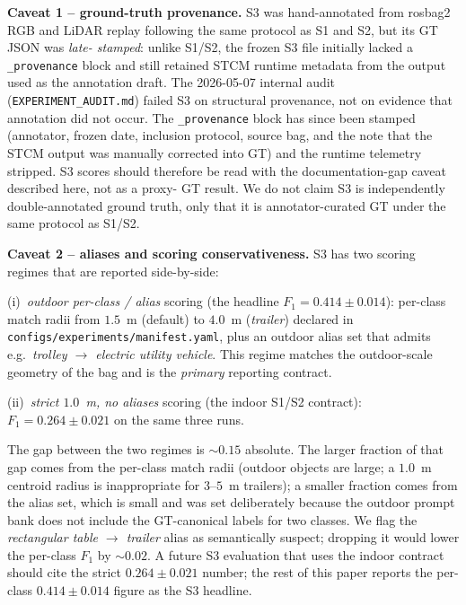 \noindent\textbf{Caveat 1 -- ground-truth provenance.}
S3 was hand-annotated from rosbag2 RGB and LiDAR replay following
the same protocol as S1 and S2, but its GT JSON was \emph{late-
stamped}: unlike S1/S2, the frozen S3 file initially lacked a
\texttt{\_provenance} block and still retained STCM runtime
metadata from the output used as the annotation draft. The
2026-05-07 internal audit (\texttt{EXPERIMENT\_AUDIT.md}) failed S3
on structural provenance, not on evidence that annotation did not
occur. The \texttt{\_provenance} block has since been stamped
(annotator, frozen date, inclusion protocol, source bag, and the
note that the STCM output was manually corrected into GT) and the
runtime telemetry stripped. S3 scores should therefore be read
with the documentation-gap caveat described here, not as a proxy-
GT result. We do not claim S3 is independently double-annotated
ground truth, only that it is annotator-curated GT under the same
protocol as S1/S2.

\noindent\textbf{Caveat 2 -- aliases and scoring conservativeness.}
S3 has two scoring regimes that are reported side-by-side:

(i)~\emph{outdoor per-class / alias} scoring (the headline
$F_1{=}0.414 \pm 0.014$): per-class match radii from $1.5$~m
(default) to $4.0$~m (\emph{trailer}) declared in
\texttt{configs/experiments/manifest.yaml}, plus an outdoor alias
set that admits e.g.\ \emph{trolley $\to$ electric utility
vehicle}. This regime matches the outdoor-scale geometry of the
bag and is the \emph{primary} reporting contract.

(ii)~\emph{strict $1.0$~m, no aliases} scoring (the indoor S1/S2
contract): $F_1{=}0.264 \pm 0.021$ on the same three runs.

The gap between the two regimes is $\sim 0.15$ absolute. The
larger fraction of that gap comes from the per-class match radii
(outdoor objects are large; a $1.0$~m centroid radius is
inappropriate for $3$--$5$~m trailers); a smaller fraction comes
from the alias set, which is small and was set deliberately
because the outdoor prompt bank does not include the
GT-canonical labels for two classes. We flag the
\emph{rectangular table $\rightarrow$ trailer} alias as
semantically suspect; dropping it would lower the per-class
$F_1$ by $\sim 0.02$. A future S3 evaluation that uses the
indoor contract should cite the strict $0.264 \pm 0.021$
number; the rest of this paper reports the per-class
$0.414 \pm 0.014$ figure as the S3 headline.

